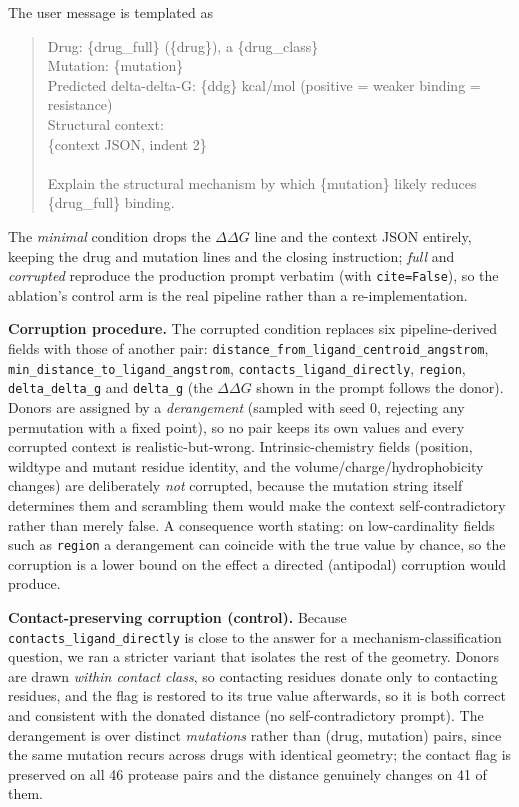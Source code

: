 \documentclass{article}
\newcommand{\ddg}{\ensuremath{\Delta\Delta G}}
\begin{document}
The user message is templated as
\begin{quote}\footnotesize\ttfamily
Drug: \{drug\_full\} (\{drug\}), a \{drug\_class\}\\
Mutation: \{mutation\}\\
Predicted delta-delta-G: \{ddg\} kcal/mol (positive = weaker binding = resistance)\\
Structural context:\\
\{context JSON, indent 2\}\\
\\
Explain the structural mechanism by which \{mutation\} likely reduces \{drug\_full\} binding.
\end{quote}
The \emph{minimal} condition drops the \ddg{} line and the context JSON entirely,
keeping the drug and mutation lines and the closing instruction; \emph{full} and
\emph{corrupted} reproduce the production prompt verbatim (with \texttt{cite=False}),
so the ablation's control arm is the real pipeline rather than a re-implementation.

\textbf{Corruption procedure.} The corrupted condition replaces six
pipeline-derived fields with those of another pair:
\texttt{distance\_from\_ligand\_centroid\_angstrom},
\texttt{min\_distance\_to\_ligand\_angstrom}, \texttt{contacts\_ligand\_directly},
\texttt{region}, \texttt{delta\_delta\_g} and \texttt{delta\_g} (the \ddg{} shown
in the prompt follows the donor). Donors are assigned by a \emph{derangement}
(sampled with seed 0, rejecting any permutation with a fixed point), so no pair
keeps its own values and every corrupted context is realistic-but-wrong.
Intrinsic-chemistry fields (position, wildtype and mutant residue identity, and
the volume/charge/hydrophobicity changes) are deliberately \emph{not} corrupted,
because the mutation string itself determines them and scrambling them would make
the context self-contradictory rather than merely false. A consequence worth
stating: on low-cardinality fields such as \texttt{region} a derangement can
coincide with the true value by chance, so the corruption is a lower bound on the
effect a directed (antipodal) corruption would produce.

\textbf{Contact-preserving corruption (control).} Because
\texttt{contacts\_ligand\_directly} is close to the answer for a
mechanism-classification question, we ran a stricter variant that isolates the
rest of the geometry. Donors are drawn \emph{within contact class}, so contacting
residues donate only to contacting residues, and the flag is restored to its
true value afterwards, so it is both correct and consistent with the donated
distance (no self-contradictory prompt). The derangement is over distinct
\emph{mutations} rather than (drug, mutation) pairs, since the same mutation
recurs across drugs with identical geometry; the contact flag is preserved on all
46 protease pairs and the distance genuinely changes on 41 of them.
\end{document}
